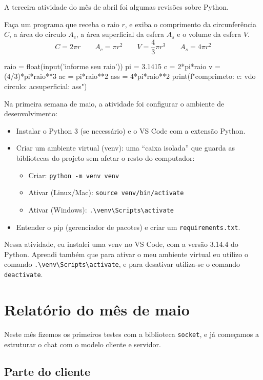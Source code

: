 	A terceira atividade do mês de abril foi algumas revisões sobre Python.
	
	Faça um programa que receba o raio $r$, e exiba o comprimento da circunferência $C$, a área do círculo $A_c$, a área superficial da esfera $A_s$ e o volume da esfera $V$.
	\[
	C = 2\pi r \qquad A_c = \pi r^2 \qquad V = \frac{4}{3}\pi r^3 \qquad A_s = 4\pi r^2
	\]
	
	\begin{pycode}
		raio = float(input('informe seu raio\n'))
		pi = 3.1415
		c = 2*pi*raio
		v = (4/3)*pi*raio**3
		ac = pi*raio**2
		ass = 4*pi*raio**2
		print(f"comprimeto: {c}\nvolume: {v}\narea do circulo: {ac}\narea superficial: {ass}")
	\end{pycode}
	
	Na primeira semana de maio, a atividade foi configurar o ambiente de desenvolvimento:
	\begin{itemize}
		\item Instalar o Python 3 (se necessário) e o VS Code com a extensão Python.
		\item Criar um ambiente virtual (venv): uma ``caixa isolada'' que guarda as bibliotecas do projeto sem afetar o resto do computador:
		\begin{itemize}
			\item Criar: \verb|python -m venv venv|
			\item Ativar (Linux/Mac): \verb|source venv/bin/activate|
			\item Ativar (Windows): \verb|.\venv\Scripts\activate|
		\end{itemize}
		\item Entender o pip (gerenciador de pacotes) e criar um \verb|requirements.txt|.
	\end{itemize}
	
	Nessa atividade, eu instalei uma venv no VS Code, com a versão 3.14.4 do Python. Aprendi também que para ativar o meu ambiente virtual eu utilizo o comando \verb|.\venv\Scripts\activate|, e para desativar utiliza-se o comando \verb|deactivate|.
	
	\section{Relatório do mês de maio}
	
	Neste mês fizemos os primeiros testes com a biblioteca \verb|socket|, e já começamos a estruturar o chat com o modelo cliente e servidor.
	
	\subsection*{Parte do cliente}
	
